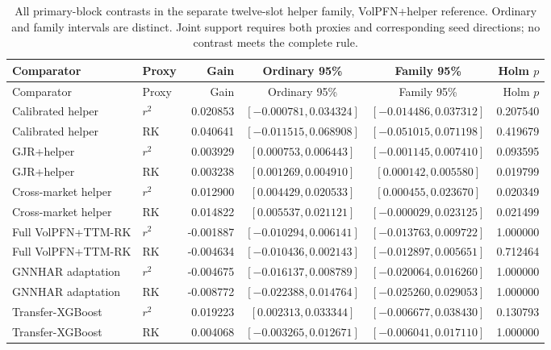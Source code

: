 \begingroup\footnotesize\setlength{\tabcolsep}{3pt}
\begin{longtable}{@{}>{\raggedright\arraybackslash}p{2.7cm}lrccr@{}}
\caption[Cross-market-helper inference]{All primary-block contrasts in the separate twelve-slot helper family, VolPFN+helper reference. Ordinary and family intervals are distinct. Joint support requires both proxies and corresponding seed directions; no contrast meets the complete rule.}\label{tab:new-helper-inference}\\
\toprule
Comparator & Proxy & Gain & Ordinary 95\% & Family 95\% & Holm $p$ \\
\midrule\endfirsthead
\toprule
Comparator & Proxy & Gain & Ordinary 95\% & Family 95\% & Holm $p$ \\
\midrule\endhead
Calibrated helper & $r^2$ & 0.020853 & $[-0.000781,0.034324]$ & $[-0.014486,0.037312]$ & 0.207540 \\
Calibrated helper & RK & 0.040641 & $[-0.011515,0.068908]$ & $[-0.051015,0.071198]$ & 0.419679 \\
GJR+helper & $r^2$ & 0.003929 & $[0.000753,0.006443]$ & $[-0.001145,0.007410]$ & 0.093595 \\
GJR+helper & RK & 0.003238 & $[0.001269,0.004910]$ & $[0.000142,0.005580]$ & 0.019799 \\
Cross-market helper & $r^2$ & 0.012900 & $[0.004429,0.020533]$ & $[0.000455,0.023670]$ & 0.020349 \\
Cross-market helper & RK & 0.014822 & $[0.005537,0.021121]$ & $[-0.000029,0.023125]$ & 0.021499 \\
Full VolPFN+TTM-RK & $r^2$ & -0.001887 & $[-0.010294,0.006141]$ & $[-0.013763,0.009722]$ & 1.000000 \\
Full VolPFN+TTM-RK & RK & -0.004634 & $[-0.010436,0.002143]$ & $[-0.012897,0.005651]$ & 0.712464 \\
GNNHAR adaptation & $r^2$ & -0.004675 & $[-0.016137,0.008789]$ & $[-0.020064,0.016260]$ & 1.000000 \\
GNNHAR adaptation & RK & -0.008772 & $[-0.022388,0.014764]$ & $[-0.025260,0.029053]$ & 1.000000 \\
Transfer-XGBoost & $r^2$ & 0.019223 & $[0.002313,0.033344]$ & $[-0.006677,0.038430]$ & 0.130793 \\
Transfer-XGBoost & RK & 0.004068 & $[-0.003265,0.012671]$ & $[-0.006041,0.017110]$ & 1.000000 \\
\bottomrule
\end{longtable}\endgroup
